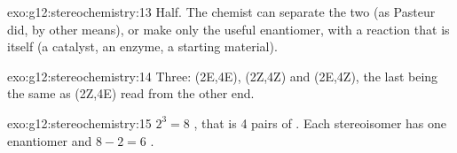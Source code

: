 \begin{solution}{exo:g12:stereochemistry:13}
Half. The chemist can separate the two  (as Pasteur did, by
other means), or make only the useful enantiomer, with a reaction that
is itself  (a  catalyst, an enzyme, a  starting
material).
\end{solution}

\begin{solution}{exo:g12:stereochemistry:14}
Three: (2E,4E), (2Z,4Z) and (2E,4Z), the last being the same  as
(2Z,4E) read from the other end.
\end{solution}

\begin{solution}{exo:g12:stereochemistry:15}
$2^3 = 8$ , that is 4 pairs of . Each
stereoisomer has one enantiomer and $8 - 2 = 6$ .
\end{solution}

